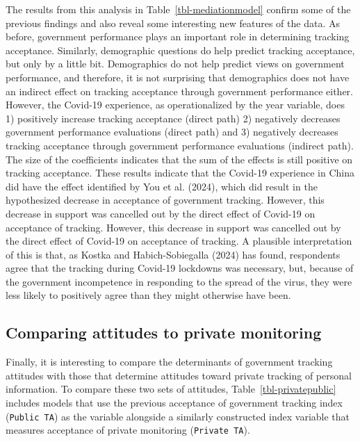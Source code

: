 \documentclass[
  letterpaper,
  DIV=11,
  numbers=noendperiod]{scrartcl}
\begin{document}
The results from this analysis in Table~\ref{tbl-mediationmodel} confirm
some of the previous findings and also reveal some interesting new
features of the data. As before, government performance plays an
important role in determining tracking acceptance. Similarly,
demographic questions do help predict tracking acceptance, but only by a
little bit. Demographics do not help predict views on government
performance, and therefore, it is not surprising that demographics does
not have an indirect effect on tracking acceptance through government
performance either. However, the Covid-19 experience, as operationalized
by the year variable, does 1) positively increase tracking acceptance
(direct path) 2) negatively decreases government performance evaluations
(direct path) and 3) negatively decreases tracking acceptance through
government performance evaluations (indirect path). The size of the
coefficients indicates that the sum of the effects is still positive on
tracking acceptance. These results indicate that the Covid-19 experience
in China did have the effect identified by You et al. (2024), which did
result in the hypothesized decrease in acceptance of government
tracking. However, this decrease in support was cancelled out by the
direct effect of Covid-19 on acceptance of tracking. However, this
decrease in support was cancelled out by the direct effect of Covid-19
on acceptance of tracking. A plausible interpretation of this is that,
as Kostka and Habich-Sobiegalla (2024) has found, respondents agree that
the tracking during Covid-19 lockdowns was necessary, but, because of
the government incompetence in responding to the spread of the virus,
they were less likely to positively agree than they might otherwise have
been.

\subsection{Comparing attitudes to private
monitoring}\label{comparing-attitudes-to-private-monitoring}

Finally, it is interesting to compare the determinants of government
tracking attitudes with those that determine attitudes toward private
tracking of personal information. To compare these two sets of
attitudes, Table~\ref{tbl-privatepublic} includes models that use the
previous acceptance of government tracking index (\texttt{Public\ TA})
as the variable alongside a similarly constructed index variable that
measures acceptance of private monitoring (\texttt{Private\ TA}).
\end{document}
